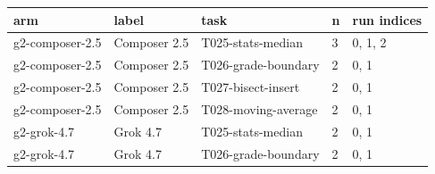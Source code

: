 \begin{tabular}{lllll}
\toprule
arm & label & task & n & run indices \\
\midrule
g2-composer-2.5 & Composer 2.5 & T025-stats-median & 3 & 0, 1, 2 \\
g2-composer-2.5 & Composer 2.5 & T026-grade-boundary & 2 & 0, 1 \\
g2-composer-2.5 & Composer 2.5 & T027-bisect-insert & 2 & 0, 1 \\
g2-composer-2.5 & Composer 2.5 & T028-moving-average & 2 & 0, 1 \\
g2-grok-4.7 & Grok 4.7 & T025-stats-median & 2 & 0, 1 \\
g2-grok-4.7 & Grok 4.7 & T026-grade-boundary & 2 & 0, 1 \\
\bottomrule
\end{tabular}
